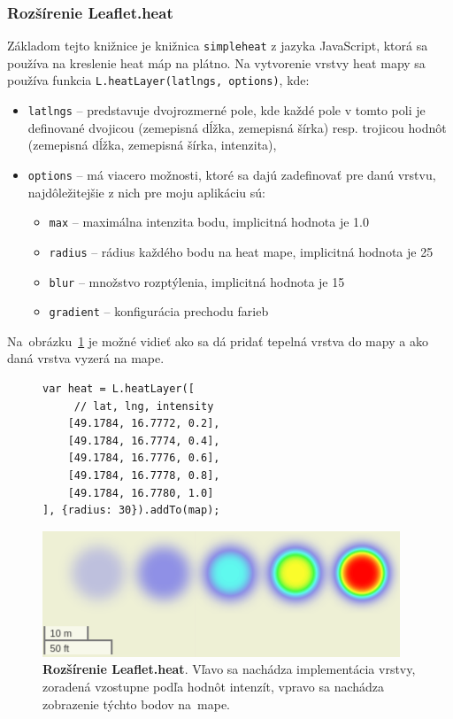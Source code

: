 \subsubsection{Rozšírenie Leaflet.heat}
Základom tejto knižnice je knižnica \texttt{simpleheat} z jazyka JavaScript, ktorá sa používa na kreslenie heat máp na plátno. Na vytvorenie vrstvy heat mapy sa používa funkcia \texttt{L.heatLayer(latlngs, options)}, kde:
\begin{itemize}
    \item \texttt{latlngs} \--- predstavuje dvojrozmerné pole, kde každé pole v tomto poli je definované dvojicou (zemepisná dĺžka, zemepisná šírka) resp. trojicou hodnôt (zemepisná dĺžka, zemepisná šírka, intenzita),
    \item \texttt{options} \--- má viacero možnosti, ktoré sa dajú zadefinovať pre danú vrstvu, najdôležitejšie z nich pre moju aplikáciu sú:
    \begin{itemize}
        \item \texttt{max} \--- maximálna intenzita bodu, implicitná hodnota je 1.0
        \item \texttt{radius} \--- rádius každého bodu na heat mape, implicitná hodnota je 25
        \item \texttt{blur} \--- množstvo rozptýlenia, implicitná hodnota je 15
        \item \texttt{gradient} \--- konfigurácia prechodu farieb
    \end{itemize}
\end{itemize}
Na~obrázku~\ref{fig:leafletheat} je možné vidieť ako sa dá pridať tepelná vrstva do mapy a ako daná vrstva vyzerá na mape.

\begin{figure}[ht]
\begin{minipage}{.5\textwidth}
\begin{lstlisting}
var heat = L.heatLayer([
     // lat, lng, intensity
    [49.1784, 16.7772, 0.2],
    [49.1784, 16.7774, 0.4],
    [49.1784, 16.7776, 0.6],
    [49.1784, 16.7778, 0.8],
    [49.1784, 16.7780, 1.0]
], {radius: 30}).addTo(map);
\end{lstlisting}
\end{minipage}
\hfill
\begin{minipage}{.5\linewidth}
    \centering
    \includegraphics[width=0.7\linewidth]{obrazky-figures/heatlayer-screenshot.png}
\end{minipage}
\caption{\textbf{Rozšírenie Leaflet.heat}. Vľavo sa nachádza implementácia vrstvy, zoradená vzostupne podľa hodnôt intenzít, vpravo sa nachádza zobrazenie týchto bodov na~mape.}
\label{fig:leafletheat}
\end{figure}

